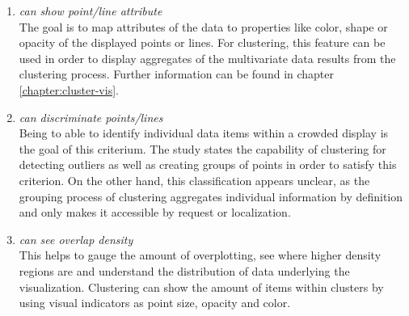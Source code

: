 \begin{enumerate}
\item \textit{can show point/line attribute}
\\ The goal is to map attributes of the data to properties like color, shape or opacity of the displayed points or lines. For clustering, this feature can be used in order to display aggregates of the multivariate data results from the clustering process. Further information can be found in chapter \ref{chapter:cluster-vis}.

\item \textit{can discriminate points/lines}
\\ Being to able to identify individual data items within a crowded display is the goal of this criterium. The study states the capability of clustering for detecting outliers as well as creating groups of points in order to satisfy this criterion. On the other hand, this classification appears unclear, as the grouping process of clustering aggregates individual information by definition and only makes it accessible by request or localization. 

\item \textit{can see overlap density}
\\ This helps to gauge the amount of overplotting, see where higher density regions are and understand the distribution of data underlying the visualization. Clustering can show the amount of items within clusters by using visual indicators as point size, opacity and color.  

\end{enumerate}

